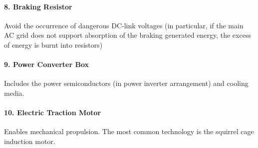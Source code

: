 \paragraph{8. Braking Resistor\\}

	Avoid the occurrence of dangerous DC-link voltages (in particular, if the main AC grid does not support absorption of the braking generated energy, the excess of energy is burnt into resistors)

\paragraph{9. Power Converter Box\\}

	Includes the power semiconductors (in power inverter arrangement) and cooling media.

\paragraph{10. Electric Traction Motor\\}

	Enables mechanical propulsion. The most common technology is the squirrel cage induction motor.




